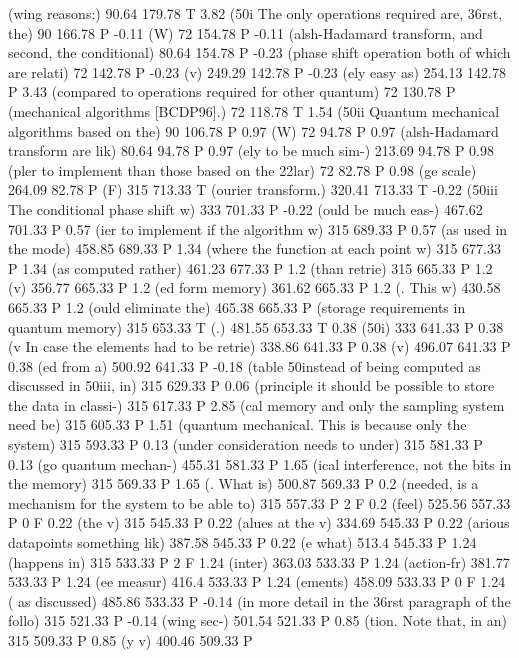 (wing reasons:) 90.64 179.78 T
3.82 (\050i The only operations required are, \336rst, the) 90 166.78 P
-0.11 (W) 72 154.78 P
-0.11 (alsh-Hadamard transform, and second, the conditional) 80.64 154.78 P
-0.23 (phase shift operation both of which are relati) 72 142.78 P
-0.23 (v) 249.29 142.78 P
-0.23 (ely easy as) 254.13 142.78 P
3.43 (compared to operations required for other quantum) 72 130.78 P
(mechanical algorithms [BCDP96].) 72 118.78 T
1.54 (\050ii Quantum mechanical algorithms based on the) 90 106.78 P
0.97 (W) 72 94.78 P
0.97 (alsh-Hadamard transform are lik) 80.64 94.78 P
0.97 (ely to be much sim-) 213.69 94.78 P
0.98 (pler to implement than those based on the \322lar) 72 82.78 P
0.98 (ge scale) 264.09 82.78 P
(F) 315 713.33 T
(ourier transform.) 320.41 713.33 T
-0.22 (\050iii The conditional phase shift w) 333 701.33 P
-0.22 (ould be much eas-) 467.62 701.33 P
0.57 (ier to implement if the algorithm w) 315 689.33 P
0.57 (as used in the mode) 458.85 689.33 P
1.34 (where the function at each point w) 315 677.33 P
1.34 (as computed rather) 461.23 677.33 P
1.2 (than retrie) 315 665.33 P
1.2 (v) 356.77 665.33 P
1.2 (ed form memory) 361.62 665.33 P
1.2 (. This w) 430.58 665.33 P
1.2 (ould eliminate the) 465.38 665.33 P
(storage requirements in quantum memory) 315 653.33 T
(.) 481.55 653.33 T
0.38 (\050i) 333 641.33 P
0.38 (v In case the elements had to be retrie) 338.86 641.33 P
0.38 (v) 496.07 641.33 P
0.38 (ed from a) 500.92 641.33 P
-0.18 (table \050instead of being computed as discussed in \050iii, in) 315 629.33 P
0.06 (principle it should be possible to store the data in classi-) 315 617.33 P
2.85 (cal memory and only the sampling system need be) 315 605.33 P
1.51 (quantum mechanical. This is because only the system) 315 593.33 P
0.13 (under consideration needs to under) 315 581.33 P
0.13 (go quantum mechan-) 455.31 581.33 P
1.65 (ical interference, not the bits in the memory) 315 569.33 P
1.65 (. What is) 500.87 569.33 P
0.2 (needed, is a mechanism for the system to be able to) 315 557.33 P
2 F
0.2 (feel) 525.56 557.33 P
0 F
0.22 (the v) 315 545.33 P
0.22 (alues at the v) 334.69 545.33 P
0.22 (arious datapoints something lik) 387.58 545.33 P
0.22 (e what) 513.4 545.33 P
1.24 (happens in) 315 533.33 P
2 F
1.24 (inter) 363.03 533.33 P
1.24 (action-fr) 381.77 533.33 P
1.24 (ee measur) 416.4 533.33 P
1.24 (ements) 458.09 533.33 P
0 F
1.24 ( as discussed) 485.86 533.33 P
-0.14 (in more detail in the \336rst paragraph of the follo) 315 521.33 P
-0.14 (wing sec-) 501.54 521.33 P
0.85 (tion. Note that, in an) 315 509.33 P
0.85 (y v) 400.46 509.33 P
